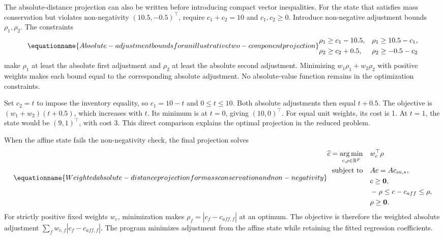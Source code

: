 The absolute-distance projection can also be written before introducing compact vector inequalities. For the state that satisfies mass conservation but violates non-negativity \((10.5,-0.5)^\top\), require \(c_1+c_2=10\) and \(c_1,c_2\geq0\). Introduce non-negative adjustment bounds \(\rho_1,\rho_2\). The constraints
\begin{equation}
\equationname{Absolute-adjustment bounds for an illustrative two-component projection}
\label{eq:icsor_scalar_absolute_constraints}
\begin{aligned}
\rho_1&\geq c_1-10.5,&\rho_1&\geq10.5-c_1,\\
\rho_2&\geq c_2+0.5,&\rho_2&\geq-0.5-c_2
\end{aligned}
\end{equation}
make \(\rho_1\) at least the absolute first adjustment and \(\rho_2\) at least the absolute second adjustment. Minimizing \(w_1\rho_1+w_2\rho_2\) with positive weights makes each bound equal to the corresponding absolute adjustment. No absolute-value function remains in the optimization constraints.

Set \(c_2=t\) to impose the inventory equality, so \(c_1=10-t\) and \(0\leq t\leq10\). Both absolute adjustments then equal \(t+0.5\). The objective is \((w_1+w_2)(t+0.5)\), which increases with \(t\). Its minimum is at \(t=0\), giving \((10,0)^\top\). For equal unit weights, its cost is 1. At \(t=1\), the state would be \((9,1)^\top\), with cost 3. This direct comparison explains the optimal projection in the reduced problem.

When the affine state fails the non-negativity check, the final projection solves
\begin{equation}
\equationname{Weighted absolute-distance projection for mass conservation and non-negativity}
\label{eq:icsor_weighted_correction}
\begin{aligned}
\widehat c =\mathop{\arg\min}_{c,\rho\in\mathbb{R}^{F}}\quad
& w_c^\top\rho\\
\text{subject to}\quad
& Ac=Ac_{in,*},\\
& c\geq\mathbf{0},\\
& -\rho\leq c-c_{aff}\leq\rho,\\
& \rho\geq\mathbf{0}.
\end{aligned}
\end{equation}
For strictly positive fixed weights \(w_c\), minimization makes \(\rho_f=|c_f-c_{aff,f}|\) at an optimum. The objective is therefore the weighted absolute adjustment \(\sum_f w_{c,f}|c_f-c_{aff,f}|\). The program minimizes adjustment from the affine state while retaining the fitted regression coefficients.

